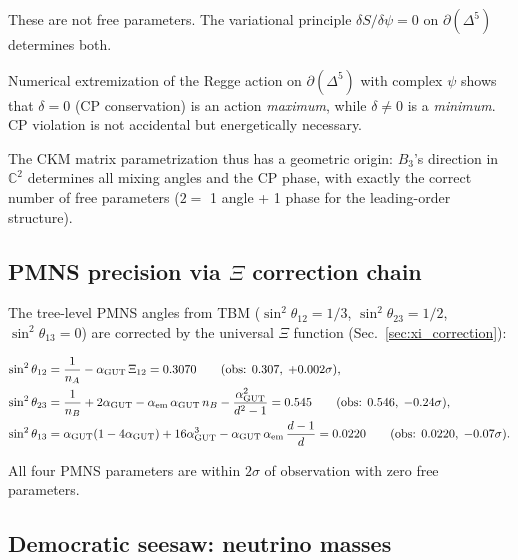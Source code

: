 These are not free parameters.  The variational principle $\delta S/\delta\psi = 0$ on $\partial(\Delta^5)$ determines both.

\begin{proposition}
\label{prop:cp}
Numerical extremization of the Regge action on $\partial(\Delta^5)$ with complex $\psi$ shows that $\delta = 0$ (CP conservation) is an action \emph{maximum}, while $\delta \neq 0$ is a \emph{minimum}.  CP violation is not accidental but energetically necessary.
\end{proposition}

The CKM matrix parametrization thus has a geometric origin: $B_3$'s direction in $\mathbb{C}^2$ determines all mixing angles and the CP phase, with exactly the correct number of free parameters ($2 = $ 1 angle + 1 phase for the leading-order structure).

\subsection{PMNS precision via $\Xi$ correction chain}
\label{sec:pmns_xi}

The tree-level PMNS angles from TBM ($\sin^2\theta_{12} = 1/3$, $\sin^2\theta_{23} = 1/2$, $\sin^2\theta_{13} = 0$) are corrected by the universal $\Xi$ function (Sec.~\ref{sec:xi_correction}):

\begin{align}
\sin^2\theta_{12} &= \frac{1}{n_A} - \alpha_{\mathrm{GUT}}\,\Xi_{12} = 0.3070 \qquad(\text{obs: } 0.307,\; +0.002\sigma), \\
\sin^2\theta_{23} &= \frac{1}{n_B} + 2\alpha_{\mathrm{GUT}} - \alpha_\mathrm{em}\,\alpha_{\mathrm{GUT}}\,n_B - \frac{\alpha_{\mathrm{GUT}}^2}{d^2-1} = 0.545 \qquad(\text{obs: } 0.546,\; -0.24\sigma), \\
\sin^2\theta_{13} &= \alpha_{\mathrm{GUT}}(1 - 4\alpha_{\mathrm{GUT}}) + 16\alpha_{\mathrm{GUT}}^3 - \alpha_{\mathrm{GUT}}\,\alpha_\mathrm{em}\,\frac{d-1}{d} = 0.0220 \qquad(\text{obs: } 0.0220,\; -0.07\sigma).
\end{align}

All four PMNS parameters are within $2\sigma$ of observation with zero free parameters.

\subsection{Democratic seesaw: neutrino masses}
\label{sec:democratic_seesaw}

